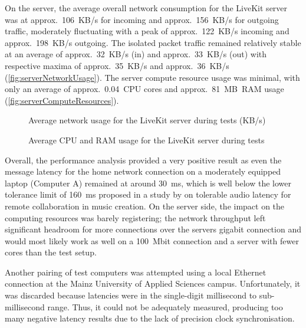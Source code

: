 On the server, the average overall network consumption for the LiveKit server was at approx.~106~\ac{KB/s} for incoming and approx.~156~KB/s for outgoing traffic, moderately fluctuating with a peak of approx.~122~\ac{KB/s} incoming and approx.~198~\ac{KB/s} outgoing.
The isolated packet traffic remained relatively stable at an average of approx.~32~\ac{KB/s} (in) and approx.~33~\ac{KB/s} (out) with respective maxima of approx.~35~\ac{KB/s} and approx.~36~\ac{KB/s} (\autoref{fig:serverNetworkUsage}).
The server compute resource usage was minimal, with only an average of approx.~0.04~\ac{CPU} cores and approx.~81~\ac{MB}~\ac{RAM} usage (\autoref{fig:serverComputeResources}).

\begin{figure*}[!ht]
\hfill

\caption[Server network usage during tests]{Average network usage for the LiveKit server during tests (\ac{KB/s})\protect}
\label{fig:serverNetworkUsage}
\end{figure*}

\begin{figure*}[!ht]
\hfill

\caption[Server compute resources usage during tests]{Average \ac{CPU} and \ac{RAM} usage for the LiveKit server during tests\protect}
\label{fig:serverComputeResources}
\end{figure*}

Overall, the performance analysis provided a very positive result as even the message latency for the home network connection on a moderately equipped laptop (Computer A) remained at around 30~\ac{ms}, which is well below the lower tolerance limit of 160~\ac{ms} proposed in a study by \textcite{audioLatency} on tolerable audio latency for remote collaboration in music creation.
On the server side, the impact on the computing resources was barely registering; the network throughput left significant headroom for more connections over the server\textquotesingle s gigabit connection and would most likely work as well on a 100~\ac{Mbit} connection and a server with fewer cores than the test setup.

Another pairing of test computers was attempted using a local Ethernet connection at the Mainz University of Applied Sciences campus.
Unfortunately, it was discarded because latencies were in the single-digit millisecond to sub-millisecond range.
Thus, it could not be adequately measured, producing too many negative latency results due to the lack of precision clock synchronisation.

